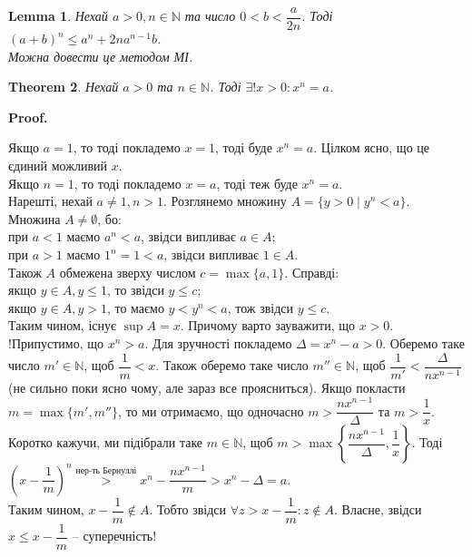 \documentclass[a4paper, 14pt]{article}
\makeatletter
\def\qed{$\blacksquare$}
\theoremstyle{theoremdd}
\newtheorem{theorem}{Theorem}[subsection]
\theoremstyle{theoremdd}
\theoremstyle{theoremdd}
\theoremstyle{theoremdd}
\theoremstyle{theoremdd}
\theoremstyle{theoremdd}
\theoremstyle{theoremdd}
\newtheorem{lemma}[theorem]{Lemma}
\theoremstyle{theoremdd}
\renewenvironment{proof}[1][Proof.\\]{\par
\pushQED{\hfill \qed}%
\normalfont \topsep6\p@\@plus6\p@\relax
\trivlist
\item\relax
{\bfseries
#1\@addpunct{.}}\hspace\labelsep\ignorespaces
}{%
\popQED\endtrivlist\@endpefalse
}
\makeatother
\begin{document}
	\begin{lemma}
	Нехай $a > 0, n \in \mathbb{N}$ та число $0 < b < \dfrac{a}{2n}$. Тоді $(a+b)^n \leq a^n + 2na^{n-1}b$.\\
	\textit{Можна довести це методом МІ}.
	\end{lemma}
	
	\begin{theorem}
	Нехай $a > 0$ та $n \in \mathbb{N}$. Тоді $\exists ! x > 0: x^n = a$.
	\end{theorem}
	
	\begin{proof}
	Якщо $a = 1$, то тоді покладемо $x = 1$, тоді буде $x^n = a$. Цілком ясно, що це єдиний можливий $x$.\\
	Якщо $n = 1$, то тоді покладемо $x = a$, тоді теж буде $x^n = a$.\\
	Нарешті, нехай $a \neq 1, n > 1$. Розглянемо множину $A = \{y > 0 \mid y^n < a\}$. Множина $A \neq \emptyset$, бо:\\
	при $a < 1$ маємо $a^n < a$, звідси випливає $a \in A$;\\
	при $a > 1$ маємо $1^n = 1 < a$, звідси випливає $1 \in A$.\\
	Також $A$ обмежена зверху числом $c = \max\{a,1\}$. Справді:\\
	якщо $y \in A, y \leq 1$, то звідси $y \leq c$;\\
	якщо  $y \in A, y > 1$, то маємо $y < y^n < a$, тож звідси $y \leq c$.\\
	Таким чином, існує $\sup A = x$. Причому варто зауважити, що $x > 0$.
	\bigskip \\
	!Припустимо, що $x^n > a$. Для зручності покладемо $\Delta = x^n - a > 0$. Оберемо таке число $m' \in \mathbb{N}$, щоб $\dfrac{1}{m} < x$. Також оберемо таке число $m'' \in \mathbb{N}$, щоб $\dfrac{1}{m'} < \dfrac{\Delta}{nx^{n-1}}$ (не сильно поки ясно чому, але зараз все проясниться). Якщо покласти $m = \max\{m',m''\}$, то ми отримаємо, що одночасно $m > \dfrac{nx^{n-1}}{\Delta}$ та $m > \dfrac{1}{x}$. Коротко кажучи, ми підібрали таке $m \in \mathbb{N}$, щоб $m > \max\left\{ \dfrac{nx^{n-1}}{\Delta}, \dfrac{1}{x} \right\}$. Тоді\\
	$\left(x - \dfrac{1}{m}\right)^n \overset{\text{нер-ть Бернуллі}}{>} x^n - \dfrac{nx^{n-1}}{m} > x^n - \Delta = a$.\\
	\iffalse Власне кажучи, мені була потрібна нерівність $m > \dfrac{nx^{n-1}}{\Delta}$, щоб можна було отримати другу нерівність з останнього ланцюга. \fi
	Таким чином, $x-\dfrac{1}{m} \notin A$. Тобто звідси $\forall z > x - \dfrac{1}{m}: z \notin A$. Власне, звідси $x \leq x - \dfrac{1}{m}$ -- суперечність!

\end{proof}
\end{document}

